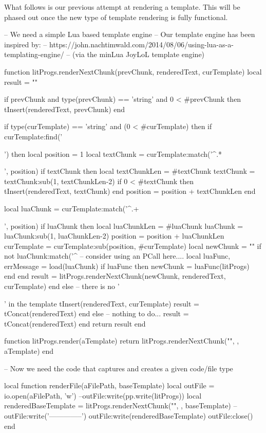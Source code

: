 {{\stopTestSuite

What follows is our previous attempt at rendering a template. This will be 
phased out once the new type of template rendering is fully functional. 

\startLuaCode

-- We need a simple Lua based template engine
-- Our template engine has been inspired by:
--   https://john.nachtimwald.com/2014/08/06/using-lua-as-a-templating-engine/
-- (via the minLua JoyLoL template engine)

function litProgs.renderNextChunk(prevChunk, renderedText, curTemplate)
  local result = ""
  
  if prevChunk
    and type(prevChunk) == 'string'
    and 0 < #prevChunk then
    tInsert(renderedText, prevChunk)
  end
  
  if type(curTemplate) == 'string' and (0 < #curTemplate) then
    if curTemplate:find('{{') then
      local position  = 1
      local textChunk = curTemplate:match('^.*{{', position)
      if textChunk then 
        local textChunkLen = #textChunk
        textChunk = textChunk:sub(1, textChunkLen-2)
        if 0 < #textChunk then tInsert(renderedText, textChunk) end
        position = position + textChunkLen
      end
      
      local luaChunk = curTemplate:match('^.+}}', position)
      if luaChunk then
        local luaChunkLen = #luaChunk
        luaChunk = luaChunk:sub(1, luaChunkLen-2)
        position = position + luaChunkLen
        curTemplate = curTemplate:sub(position, #curTemplate)
        local newChunk = ""
        if not luaChunk:match('^%
          -- consider using an PCall here....
          local luaFunc, errMessage = load(luaChunk)
          if luaFunc then
            newChunk = luaFunc(litProgs)
          end
        end
        result = litProgs.renderNextChunk(newChunk, renderedText, curTemplate)
      end
    else -- there is no '{{' in the template
      tInsert(renderedText, curTemplate)
      result = tConcat(renderedText)
    end
  else
    -- nothing to do...
    result = tConcat(renderedText)
  end
  return result
end

function litProgs.render(aTemplate)
  return litProgs.renderNextChunk("", { }, aTemplate)
end

-- Now we need the code that captures and creates a given code/file type 

local function renderFile(aFilePath, baseTemplate)
  local outFile = io.open(aFilePath, 'w')
  --outFile:write(pp.write(litProgs))
  local renderedBaseTemplate = litProgs.renderNextChunk("", {}, baseTemplate)
  --outFile:write('\n--------------\n')
  outFile:write(renderedBaseTemplate)
  outFile:close()
end

}}}}}}
